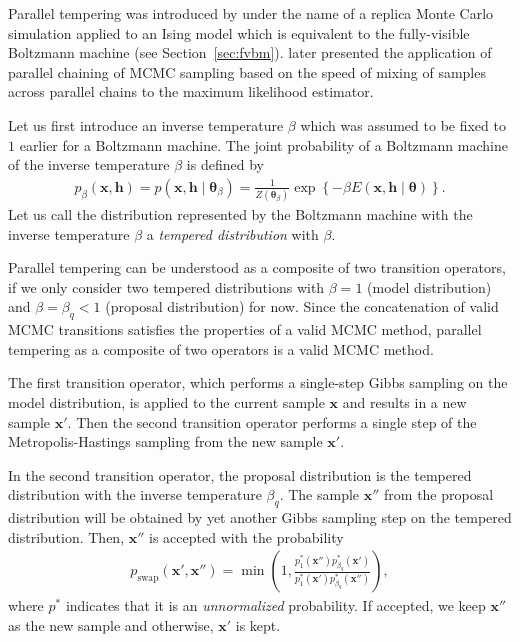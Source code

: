 \documentclass[dissertation,nocontribution]{aaltoseries}
\newcommand{\vect}[1]{\mathbf{#1}}
\newcommand{\vects}[1]{\boldsymbol{#1}}
\newcommand{\vh}[0]{\vect{h}}
\newcommand{\vx}[0]{\vect{x}}
\newcommand{\TT}[0]{{\vects{\theta}}}
\begin{document}
Parallel tempering was introduced by \citet{Swendsen1986}
under the name of a replica Monte Carlo simulation applied
to an Ising model which is equivalent to the fully-visible
Boltzmann machine (see Section~\ref{sec:fvbm}).
\citet{Geyer1991} later presented the application of
parallel chaining of MCMC sampling based on the speed of
mixing of samples across parallel chains to the maximum
likelihood estimator.

Let us first introduce an inverse temperature $\beta$
which was assumed to be fixed to $1$ earlier for a Boltzmann
machine. The joint probability
of a Boltzmann machine of the inverse temperature $\beta$ is defined by
\begin{align*}
    p_{\beta} (\vx, \vh) = p (\vx, \vh \mid \TT_\beta) =
    \frac{1}{Z(\TT_\beta)} \exp\left\{ -\beta E(\vx, \vh
    \mid \TT) \right\}.
\end{align*}
Let us call the distribution represented by the Boltzmann
machine with the inverse temperature $\beta$ a
\textit{tempered distribution} with $\beta$.

Parallel tempering can be understood as a composite of two
transition operators, if we only consider two
tempered distributions with $\beta=1$ (model distribution)
and $\beta = \beta_q < 1$ (proposal distribution) for now.  Since
the concatenation of valid MCMC transitions satisfies the
properties of a valid MCMC method, parallel tempering as a
composite of two operators is a valid MCMC method.

The first transition operator, which performs a single-step
Gibbs sampling on the model distribution, is applied to the
current sample $\vx$ and results in a new sample $\vx'$.
Then the second transition operator performs a single step
of the Metropolis-Hastings sampling from the new sample
$\vx'$.

In the second transition operator, the proposal distribution
is the tempered distribution with the inverse temperature
$\beta_q$. The sample $\vx''$ from the proposal distribution
will be obtained by yet another Gibbs sampling step on the
tempered distribution. Then, $\vx''$ is accepted with the
probability
\begin{align}
    \label{eq:pt_swap_prob}
    p_\text{swap} (\vx', \vx'') = \min \left( 1, \frac{p_1^*
    (\vx'') p^*_{\beta_q} (\vx')}{p^*_1(\vx')
    p^*_{\beta_q}(\vx'')}
    \right),
\end{align}
where $p^*$ indicates that it is an \textit{unnormalized}
probability. If accepted, we keep $\vx''$ as the new
sample and otherwise, $\vx'$ is kept.
\end{document}
